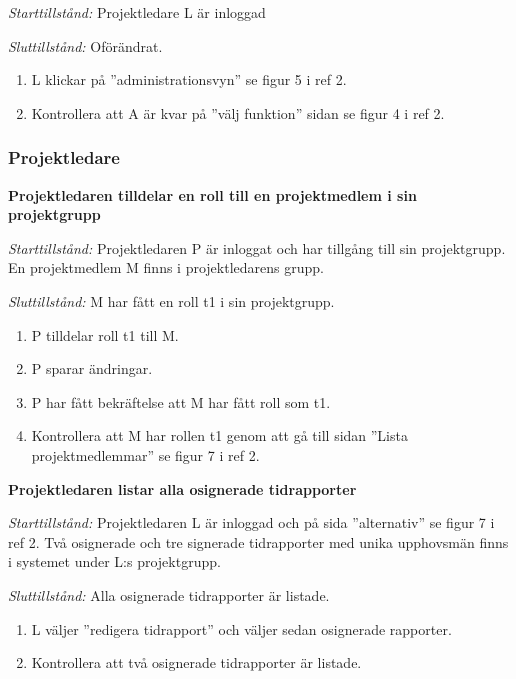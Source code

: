 \documentclass[a4paper]{article}
\begin{document}
\begin{FT}
\emph{Starttillstånd:} Projektledare L är inloggad

\emph{Sluttillstånd:} Oförändrat.

\begin{enumerate}
\item L klickar på ''administrationsvyn'' se figur 5 i ref 2.
\item Kontrollera att A är kvar på ''välj funktion'' sidan se figur 4 i ref 2.

\end{enumerate}
\end{FT}

\subsubsection{Projektledare}
\begin{FT}

\item %
\textbf{Projektledaren tilldelar en roll till en projektmedlem i sin projektgrupp}

\emph{Starttillstånd:} Projektledaren P är inloggat och har tillgång till sin projektgrupp. En projektmedlem M finns i projektledarens grupp.

\emph{Sluttillstånd:} M har fått en roll t1 i sin projektgrupp.

\begin{enumerate}
\item P tilldelar roll t1 till M.
\item P sparar ändringar.
\item P har fått bekräftelse att M har fått roll som t1.
\item Kontrollera att M har rollen t1 genom att gå till sidan ''Lista projektmedlemmar'' se figur 7 i ref 2.
\end{enumerate}

\item %
\textbf{Projektledaren listar alla osignerade tidrapporter}

\emph{Starttillstånd:} Projektledaren L är inloggad och på sida ''alternativ'' se figur 7 i ref 2. Två osignerade och tre signerade tidrapporter med unika upphovsmän finns i systemet under L:s projektgrupp.

\emph{Sluttillstånd:} Alla osignerade tidrapporter är listade.                          

\begin{enumerate}
\item L väljer ''redigera tidrapport'' och väljer sedan osignerade rapporter.
\item Kontrollera att två osignerade tidrapporter är listade.
\end{enumerate}


\end{FT}
\end{document}
